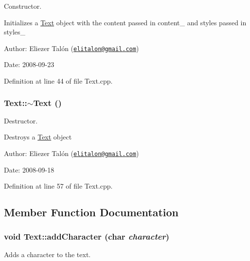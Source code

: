 Constructor. 

Initializes a \hyperlink{class_text}{Text} object with the content passed in content\_\- and styles passed in styles\_\-

\begin{Desc}
\item[Author:]Eliezer Talón (\href{mailto:elitalon@gmail.com}{\tt elitalon@gmail.com}) \end{Desc}
\begin{Desc}
\item[Date:]2008-09-23 \end{Desc}


Definition at line 44 of file Text.cpp.\hypertarget{class_text_2d49e5c280e205125b149f7777ae30c7}{
\subsubsection[$\sim$Text]{\setlength{\rightskip}{0pt plus 5cm}Text::$\sim$Text ()}}
\label{class_text_2d49e5c280e205125b149f7777ae30c7}


Destructor. 

Destroys a \hyperlink{class_text}{Text} object

\begin{Desc}
\item[Author:]Eliezer Talón (\href{mailto:elitalon@gmail.com}{\tt elitalon@gmail.com}) \end{Desc}
\begin{Desc}
\item[Date:]2008-09-18 \end{Desc}


Definition at line 57 of file Text.cpp.

\subsection{Member Function Documentation}
\hypertarget{class_text_f30df66d8aa08a4e202512a358534f6c}{
\subsubsection[addCharacter]{\setlength{\rightskip}{0pt plus 5cm}void Text::addCharacter (char {\em character})}}
\label{class_text_f30df66d8aa08a4e202512a358534f6c}


Adds a character to the text. 

